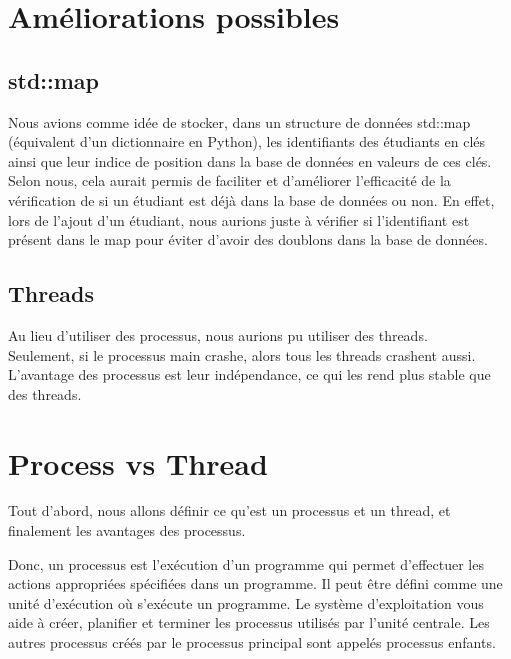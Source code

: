 \documentclass[utf8]{article}
\begin{document}
\section{Améliorations possibles}
\subsection{std::map}
\indent{}
\par
Nous avions comme idée de stocker, dans un structure de données std::map (équivalent d'un dictionnaire en Python), les identifiants des étudiants en clés ainsi que leur indice de position dans la base de données en valeurs de ces clés. 
Selon nous, cela aurait permis de faciliter et d'améliorer l'efficacité de la vérification de si un étudiant est déjà dans la base de données ou non. En effet, lors de l'ajout d'un étudiant, nous aurions juste à vérifier si l'identifiant est présent dans le map pour éviter d'avoir des doublons dans la base de données.
\par 
\subsection{Threads}
\indent{}
\par
Au lieu d'utiliser des processus, nous aurions pu utiliser des threads.\\
Seulement, si le processus main crashe, alors tous les threads crashent aussi. \\

L'avantage des processus est leur indépendance, ce qui les rend plus stable que des threads.\\

\section{Process vs Thread}
\indent{}
\par

Tout d'abord, nous allons définir ce qu'est un processus et un thread, et finalement les avantages des processus.

Donc, un processus est l'exécution d'un programme qui permet d'effectuer les actions appropriées spécifiées dans un programme. Il peut être défini comme une unité d'exécution où s'exécute un programme. Le système d'exploitation vous aide à créer, planifier et terminer les processus utilisés par l'unité centrale. Les autres processus créés par le processus principal sont appelés processus enfants.
\end{document}
